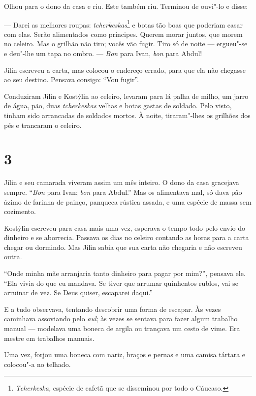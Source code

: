 Olhou para o dono da casa e riu. Este também riu. Terminou de ouvi"-lo e
disse:

--- Darei as melhores roupas: \emph{tcherkeskas}\footnote{\emph{Tcherkeska,}
  espécie de cafetã que se disseminou por todo o Cáucaso.} e botas tão
boas que poderiam casar com elas. Serão alimentados como príncipes.
Querem morar juntos, que morem no celeiro. Mas o grilhão não tiro; vocês
vão fugir. Tiro só de noite --- ergueu"-se e deu"-lhe um tapa no ombro. ---
\emph{Bon} para Ivan, \emph{bon} para Abdul!

Jílin escreveu a carta, mas colocou o endereço errado, para que ela não
chegasse ao seu destino. Pensava consigo: ``Vou fugir''.

Conduziram Jílin e Kostýlin ao celeiro, levaram para lá palha de milho,
um jarro de água, pão, duas \emph{tcherkeskas} velhas e botas gastas de
soldado. Pelo visto, tinham sido arrancadas de soldados mortos. À noite,
tiraram"-lhes os grilhões dos pés e trancaram o celeiro.

\section{3}

Jílin e seu camarada viveram assim um mês inteiro. O dono da casa
gracejava sempre. ``\emph{Bon} para Ivan; \emph{bon} para Abdul.'' Mas
os alimentava mal, só dava pão ázimo de farinha de painço, panqueca
rústica assada, e uma espécie de massa sem cozimento.

Kostýlin escreveu para casa mais uma vez, esperava o tempo todo pelo
envio do dinheiro e se aborrecia. Passava os dias no celeiro contando as
horas para a carta chegar ou dormindo. Mas Jílin sabia que sua carta não
chegaria e não escreveu outra.

``Onde minha mãe arranjaria tanto dinheiro para pagar por mim?'',
pensava ele. ``Ela vivia do que eu mandava. Se tiver que arrumar
quinhentos rublos, vai se arruinar de vez. Se Deus quiser, escaparei
daqui.''

E a tudo observava, tentando descobrir uma forma de escapar. Às vezes
caminhava assoviando pelo \emph{aul}; às vezes se sentava para fazer
algum trabalho manual --- modelava uma boneca de argila ou trançava um
cesto de vime. Era mestre em trabalhos manuais.

Uma vez, forjou uma boneca com nariz, braços e pernas e uma camisa
tártara e colocou"-a no telhado.

